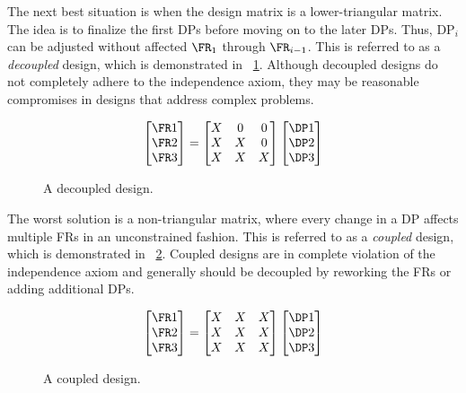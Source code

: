 The next best situation is when the design matrix is a lower-triangular matrix.  The idea is to finalize the first
DPs before moving on to the later DPs.  Thus, \(\text{DP}_i\) can be adjusted without affected \(\FR_1\) through
\(\FR_{i-1}\).  This is referred to as a \emph{decoupled} design, which is demonstrated in
\figurename~\ref{fig:decoupled}.  Although decoupled designs do not completely adhere to the independence axiom,
they may be reasonable compromises in designs that address complex problems.

\begin{figure}[H]
  \label{fig:decoupled}
  \begin{equation*}
    \begin{bmatrix}
      \FR1 \\ \FR2 \\ \FR3
    \end{bmatrix}=\begin{bmatrix}
    X & 0 & 0 \\
    X & X & 0 \\
    X & X & X
    \end{bmatrix}\begin{bmatrix}
      \DP1 \\ \DP2 \\ \DP3
    \end{bmatrix}
  \end{equation*}
  \caption{A decoupled design.}
\end{figure}

The worst solution is a non-triangular matrix, where every change in a DP affects multiple FRs in an unconstrained
fashion.  This is referred to as a \emph{coupled} design, which is demonstrated in \figurename~\ref{fig:coupled}.
Coupled designs are in complete violation of the independence axiom and generally should be decoupled by reworking
the FRs or adding additional DPs.

\begin{figure}[H]
  \label{fig:coupled}
  \begin{equation*}
    \begin{bmatrix}
      \FR1 \\ \FR2 \\ \FR3
    \end{bmatrix}=\begin{bmatrix}
    X & X & X \\
    X & X & X \\
    X & X & X
    \end{bmatrix}\begin{bmatrix}
      \DP1 \\ \DP2 \\ \DP3
    \end{bmatrix}
  \end{equation*}
  \caption{A coupled design.}
\end{figure}

